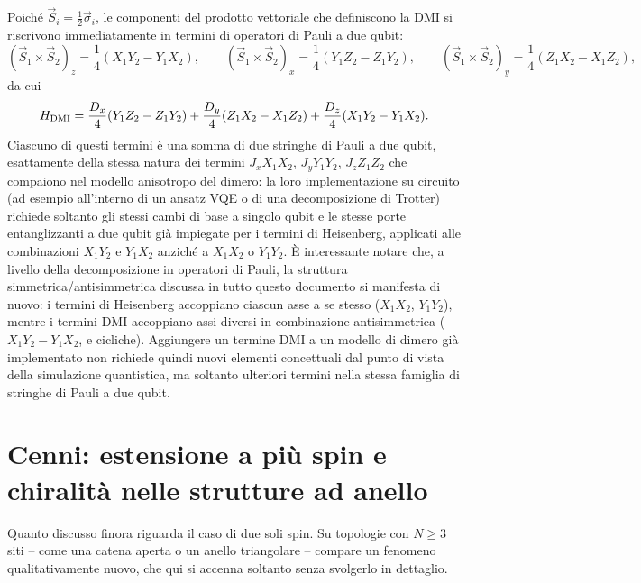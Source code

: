 \documentclass[11pt,a4paper]{article}
\begin{document}
Poich\'e $\vec S_i=\tfrac12\vec\sigma_i$, le componenti del prodotto vettoriale che
definiscono la DMI si riscrivono immediatamente in termini di operatori di Pauli a due
qubit:
$$(\vec S_1\times\vec S_2)_z = \frac14(X_1Y_2-Y_1X_2), \qquad (\vec S_1\times\vec S_2)_x = \frac14(Y_1Z_2-Z_1Y_2), \qquad (\vec S_1\times\vec S_2)_y = \frac14(Z_1X_2-X_1Z_2),$$
da cui
$$H_{\rm DMI} = \frac{D_x}{4}(Y_1Z_2-Z_1Y_2) + \frac{D_y}{4}(Z_1X_2-X_1Z_2) + \frac{D_z}{4}(X_1Y_2-Y_1X_2).$$
Ciascuno di questi termini \`e una somma di due stringhe di Pauli a due qubit,
esattamente della stessa natura dei termini $J_xX_1X_2$, $J_yY_1Y_2$, $J_zZ_1Z_2$ che
compaiono nel modello anisotropo del dimero: la loro implementazione su circuito (ad
esempio all'interno di un ansatz VQE o di una decomposizione di Trotter) richiede
soltanto gli stessi cambi di base a singolo qubit e le stesse porte entanglizzanti a
due qubit gi\`a impiegate per i termini di Heisenberg, applicati alle combinazioni
$X_1Y_2$ e $Y_1X_2$ anzich\'e a $X_1X_2$ o $Y_1Y_2$. \`E interessante notare che, a
livello della decomposizione in operatori di Pauli, la struttura
simmetrica/antisimmetrica discussa in tutto questo documento si manifesta di nuovo: i
termini di Heisenberg accoppiano ciascun asse a se stesso ($X_1X_2$, $Y_1Y_2$), mentre
i termini DMI accoppiano assi diversi in combinazione antisimmetrica ($X_1Y_2-Y_1X_2$,
e cicliche). Aggiungere un termine DMI a un modello di dimero gi\`a implementato non
richiede quindi nuovi elementi concettuali dal punto di vista della simulazione
quantistica, ma soltanto ulteriori termini nella stessa famiglia di stringhe di Pauli a
due qubit.

\section{Cenni: estensione a pi\`u spin e chiralit\`a nelle strutture ad anello}

Quanto discusso finora riguarda il caso di due soli spin. Su topologie con $N\geq3$
siti -- come una catena aperta o un anello triangolare -- compare un fenomeno
qualitativamente nuovo, che qui si accenna soltanto senza svolgerlo in dettaglio.
\end{document}
